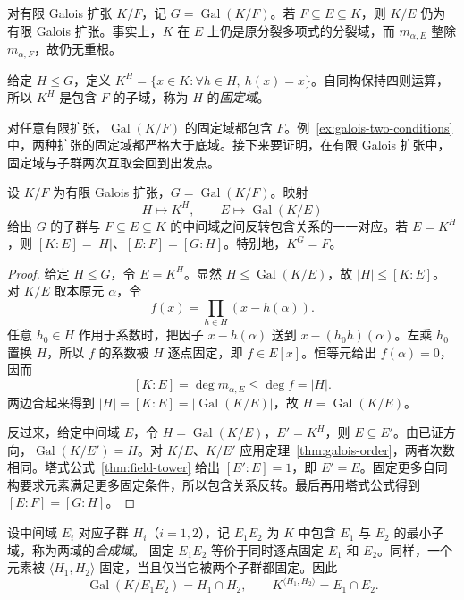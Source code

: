 \documentclass[lang=cn,a4paper,fontset=none,zihao=false,10pt,openany,twoside]{beautybook}
\numberwithin{algorithm}{chapter}
\begin{document}
对有限 Galois 扩张 $K/F$，记 $G=\operatorname{Gal}(K/F)$。若 $F\subseteq E\subseteq K$，则 $K/E$ 仍为有限 Galois 扩张。事实上，$K$ 在 $E$ 上仍是原分裂多项式的分裂域，而 $m_{\alpha,E}$ 整除 $m_{\alpha,F}$，故仍无重根。

\begin{definition}[固定域]
给定 $H\le G$，定义 $K^H=\{x\in K:\forall h\in H,\ h(x)=x\}$。自同构保持四则运算，所以 $K^H$ 是包含 $F$ 的子域，称为 $H$ 的\emph{固定域}。
\end{definition}
对任意有限扩张，$\operatorname{Gal}(K/F)$ 的固定域都包含 $F$。例~\ref{ex:galois-two-conditions} 中，两种扩张的固定域都严格大于底域。接下来要证明，在有限 Galois 扩张中，固定域与子群两次互取会回到出发点。

\begin{theorem}\label{thm:galois-correspondence}
设 $K/F$ 为有限 Galois 扩张，$G=\operatorname{Gal}(K/F)$。映射
\[
 H\longmapsto K^H,\qquad
 E\longmapsto \operatorname{Gal}(K/E)
\]
给出 $G$ 的子群与 $F\subseteq E\subseteq K$ 的中间域之间反转包含关系的一一对应。若 $E=K^H$，则 $[K:E]=|H|$、$[E:F]=[G:H]$。特别地，$K^G=F$。
\end{theorem}
\begin{proof}
给定 $H\le G$，令 $E=K^H$。显然 $H\le \operatorname{Gal}(K/E)$，故 $|H|\le[K:E]$。对 $K/E$ 取本原元 $\alpha$，令
\[
 f(x)=\prod_{h\in H}(x-h(\alpha)).
\]
任意 $h_0\in H$ 作用于系数时，把因子 $x-h(\alpha)$ 送到 $x-(h_0h)(\alpha)$。左乘 $h_0$ 置换 $H$，所以 $f$ 的系数被 $H$ 逐点固定，即 $f\in E[x]$。恒等元给出 $f(\alpha)=0$，因而
\[
 [K:E]=\deg m_{\alpha,E}\le\deg f=|H|.
\]
两边合起来得到 $|H|=[K:E]=|\operatorname{Gal}(K/E)|$，故 $H=\operatorname{Gal}(K/E)$。

反过来，给定中间域 $E$，令 $H=\operatorname{Gal}(K/E)$，$E'=K^H$，则 $E\subseteq E'$。由已证方向，$\operatorname{Gal}(K/E')=H$。对 $K/E$、$K/E'$ 应用定理~\ref{thm:galois-order}，两者次数相同。塔式公式~\ref{thm:field-tower} 给出 $[E':E]=1$，即 $E'=E$。固定更多自同构要求元素满足更多固定条件，所以包含关系反转。最后再用塔式公式得到 $[E:F]=[G:H]$。
\end{proof}

设中间域 $E_i$ 对应子群 $H_i$（$i=1,2$），记 $E_1E_2$ 为 $K$ 中包含 $E_1$ 与 $E_2$ 的最小子域，称为两域的\emph{合成域}。
固定 $E_1E_2$ 等价于同时逐点固定 $E_1$ 和 $E_2$。同样，一个元素被 $\langle H_1,H_2\rangle$ 固定，当且仅当它被两个子群都固定。因此
\[
 \operatorname{Gal}(K/E_1E_2)=H_1\cap H_2,\qquad
 K^{\langle H_1,H_2\rangle}=E_1\cap E_2.
\]
\end{document}
